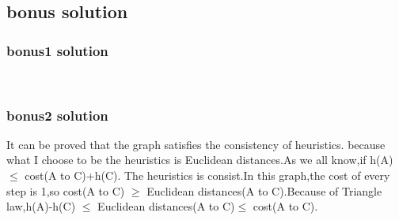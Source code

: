 \documentclass[aps,letterpaper,10pt]{revtex4}
\begin{document}
\subsection{bonus solution }

 \subsubsection{bonus1 solution }

	\begin{figure}[H]
		\centering
		 \\
		
	\end{figure}
	
 \subsubsection{bonus2 solution }	
	\item It can be proved that the graph satisﬁes the consistency of heuristics. because what I choose to be the heuristics is Euclidean distances.As we all know,if h(A)$\leqslant$ cost(A to C)+h(C).	The heuristics is consist.In this graph,the cost of every step is 1,so cost(A to C) $\geqslant$ Euclidean distances(A to C).Because of Triangle law,h(A)-h(C) $\leqslant$ Euclidean distances(A to C)$\leqslant$ cost(A to C). 
	 


\end{document}
